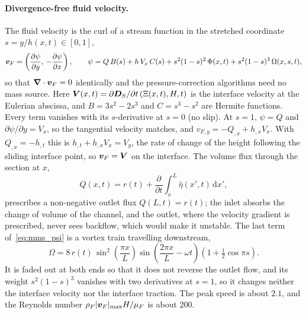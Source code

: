 \paragraph{Divergence-free fluid velocity.}
The fluid velocity is the curl of a stream function in the stretched coordinate $s = y/h(x,t) \in [0,1]$,
\begin{equation}
	\boldsymbol{v}_F = \left(\frac{\partial\psi}{\partial y},\, -\frac{\partial\psi}{\partial x}\right), \qquad
	\psi = Q\,B(s) + h\,V_x\,C(s) + s^2(1-s)^2\,\Phi(x,t) + s^2(1-s)^3\,\Omega(x,s,t),
	\label{eq:mms_psi}
\end{equation}
so that $\boldsymbol{\nabla}\cdot\boldsymbol{v}_F = 0$ identically and the pressure-correction algorithms need no mass source.
Here $\boldsymbol{V}(x,t) = \partial\boldsymbol{D}_S/\partial t\,(\Xi(x,t), H, t)$ is the interface velocity at the Eulerian abscissa, and $B = 3s^2 - 2s^3$ and $C = s^3 - s^2$ are Hermite functions.
Every term vanishes with its $s$-derivative at $s = 0$ (no slip).
At $s = 1$, $\psi = Q$ and $\partial\psi/\partial y = V_x$, so the tangential velocity matches, and $v_{F,y} = -Q_{,x} + h_{,x}V_x$.
With $Q_{,x} = -h_{,t}$ this is $h_{,t} + h_{,x}V_x = V_y$, the rate of change of the height following the sliding interface point, so $\boldsymbol{v}_F = \boldsymbol{V}$ on the interface.
The volume flux through the section at $x$,
\begin{equation}
	Q(x,t) = r(t) + \frac{\partial}{\partial t}\int_x^L \hat\eta(x',t)\,\mathrm{d}x',
	\label{eq:mms_Q}
\end{equation}
prescribes a non-negative outlet flux $Q(L,t) = r(t)$; the inlet absorbs the change of volume of the channel, and the outlet, where the velocity gradient is prescribed, never sees backflow, which would make it unstable.
The last term of~\eqref{eq:mms_psi} is a vortex train travelling downstream,
\begin{equation}
	\Omega = 8\,r(t)\,\sin^2\!\left(\frac{\pi x}{L}\right)\sin\!\left(\frac{2\pi x}{L} - \omega t\right)\left(1 + \tfrac{1}{2}\cos\pi s\right).
\end{equation}
It is faded out at both ends so that it does not reverse the outlet flow, and its weight $s^2(1-s)^3$ vanishes with two derivatives at $s = 1$, so it changes neither the interface velocity nor the interface traction.
The peak speed is about $2.1$, and the Reynolds number $\rho_F |\boldsymbol{v}_F|_{\max} H/\mu_F$ is about $200$.

